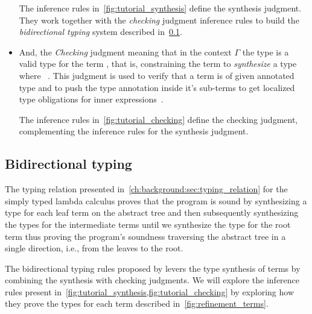\documentclass[
  oneside,
  english,
  coorientadorbanca,
  noabntexcite
]{ufsc-thesis-rn46-2019}
\newcommand{\codett}[1]{\text{\scpfamily#1}}
\newcommand{\code}[1]{\text{\scpfamily\setlength\spaceskip{0.35em}#1}}
\newcommand{\typer}[2]{\code{#1 \codett{:} #2}}
\newcommand{\ctxtr}[2]{\code{{$\Gamma$}#1 {$\vdash$} #2}}
\newcommand{\typecxr}[3]{\ctxtr{#1}{\typer{#2}{#3}}}
\newcommand{\subtyr}[2]{\code{#1 $\prec :$ #2}}
\newcommand{\checkr}[2]{\code{#1 $\Leftarrow$ #2}}
\newcommand{\checkcxr}[3]{\ctxtr{#1}{\checkr{#2}{#3}}}
\begin{document}
\begin{itemize}
        The inference rules in~\cref{fig:tutorial_synthesis} define the synthesis judgment.
        They work together with the \textit{checking} judgment inference rules to build the \textit{bidirectional typing} system described in~\cref{sub:bidirectional_typing}.

  \item And, the \textit{Checking} judgment \checkcxr{}{e}{t} meaning that in the context $\Gamma$ the type \code{t} is a valid type for the term \code{e}, that is, constraining the term \code{e} to \textit{synthesize} a type \code{s} where \subtyr{s}{t}~\cite{jhala2020tutorial}.
        This judgment is used to verify that a term is of given annotated type and to push the type annotation inside it's sub-terms to get localized type obligations for inner expressions~\cite{jhala2020tutorial}.

        The inference rules in~\cref{fig:tutorial_checking} define the checking judgment, complementing the inference rules for the synthesis judgment.
\end{itemize}

\subsection{Bidirectional typing}\label{sub:bidirectional_typing}

The typing relation \typecxr{}{x}{T} presented in~\cref{ch:background:sec:typing_relation} for the simply typed lambda calculus proves that the program is sound by synthesizing a type for each leaf term on the abstract tree and then subsequently synthesizing the types for the intermediate terms until we synthesize the type for the root term thus proving the program's soundness traversing the abstract tree in a single direction, i.e., from the leaves to the root.

The bidirectional typing rules proposed by \textcite{jhala2020tutorial} levers the type synthesis of terms by combining the synthesis with checking judgments.
We will explore the inference rules present in~\cref{fig:tutorial_synthesis,fig:tutorial_checking} by exploring how they prove the types for each term \code{e} described in~\cref{fig:refinement_terms}.
\end{document}
